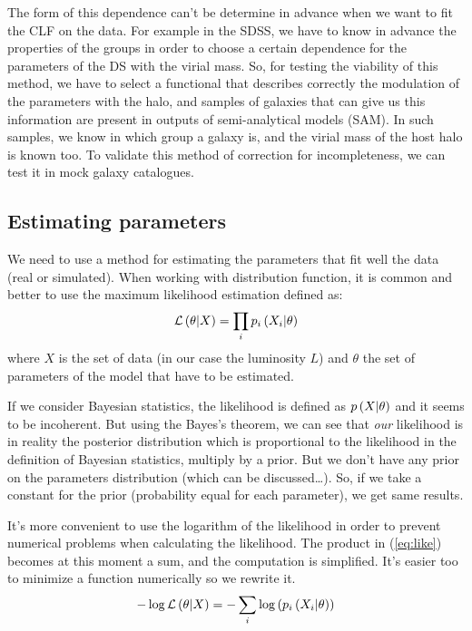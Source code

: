 The form of this dependence can't be determine in advance when we want to fit
the CLF on the data. For example in the SDSS, we have to know in advance the
properties of the groups in order to choose a certain dependence for the
parameters of the DS with the virial mass. So, for testing the viability of
this method, we have to select a functional that describes correctly the
modulation of the parameters with the halo, and samples of galaxies that can
give us this information are present in outputs of semi-analytical models
(SAM). In such samples, we know in which group a galaxy is, and the virial mass
of the host halo is known too. To validate this method of correction for
incompleteness, we can test it in mock galaxy catalogues.
%
\subsection{Estimating parameters}
%
We need to use a method for estimating the parameters that fit well the data
(real or simulated). When working with distribution function, it is common and
better to use the maximum likelihood estimation defined as:
%
\begin{equation}\label{eq:like}
    \mathcal{L}\left({\theta|X}\right)=\prod_i{p_i\left({X_i|\theta}\right)}
\end{equation}
%
where $X$ is the set of data (in our case the luminosity $L$) and $\theta$ the
set of parameters of the model that have to be estimated.

If we consider Bayesian statistics, the likelihood is defined as
$p\left({X|\theta}\right)$ and it seems to be incoherent. But using the Bayes's
theorem, we can see that \emph{our} likelihood is in reality the posterior
distribution which is proportional to the likelihood in the definition of
Bayesian statistics, multiply by a prior. But we don't have any prior on the
parameters distribution (which can be discussed\ldots). So, if we take a
constant for the prior (probability equal for each parameter), we get same
results.

It's more convenient to use the logarithm of the likelihood in order to prevent
numerical problems when calculating the likelihood. The product in
(\ref{eq:like}) becomes at this moment a sum, and the computation is
simplified. It's easier too to minimize a function numerically so we rewrite
it.
%
\begin{equation}\label{eq:loglike}
    -\log\mathcal{L}\left({\theta|X}\right)=-\sum_i{\log\left({p_i\left({X_i|\theta}\right)}\right)}
\end{equation}

